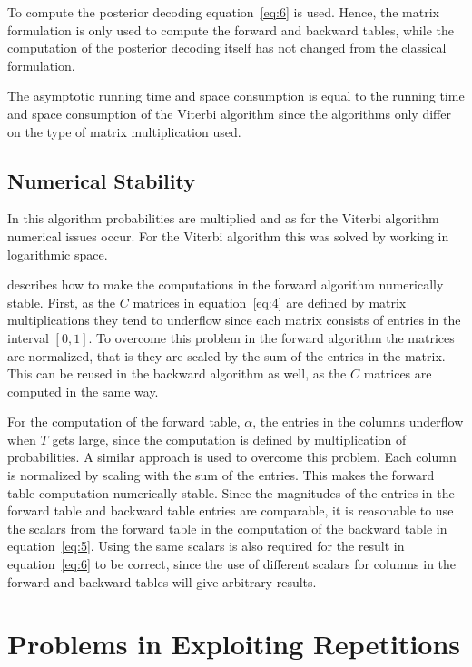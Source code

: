 To compute the posterior decoding equation~\eqref{eq:6} is used. Hence, the
matrix formulation is only used to compute the forward and backward tables,
while the computation of the posterior decoding itself has not changed from the
classical formulation.

The asymptotic running time and space consumption is equal to the running time
and space consumption of the Viterbi algorithm since the algorithms only
differ on the type of matrix multiplication used.

\subsection{Numerical Stability}

In this algorithm probabilities are multiplied and as for the Viterbi algorithm
numerical issues occur. For the Viterbi algorithm this was solved by working in
logarithmic space.

\citet{sand2013ziphmmlib} describes how to make the computations in the forward
algorithm numerically stable. First, as the $C$ matrices in
equation~\eqref{eq:4} are defined by matrix multiplications they tend to
underflow since each matrix consists of entries in the interval $[0, 1]$. To
overcome this problem in the forward algorithm the matrices are normalized,
that is they are scaled by the sum of the entries in the matrix. This can be
reused in the backward algorithm as well, as the $C$ matrices are computed in
the same way.

For the computation of the forward table, $\alpha$, the entries in the columns underflow when
$T$ gets large, since the computation is defined by multiplication of
probabilities. A similar approach is used to overcome this problem. Each column
is normalized by scaling with the sum of the entries. This makes the forward
table computation numerically stable. Since the magnitudes of the entries in
the forward table and backward table entries are comparable, it is reasonable
to use the scalars from the forward table in the computation of the backward
table in equation~\eqref{eq:5}. Using the same scalars is also required for the
result in equation~\eqref{eq:6} to be correct, since the use of different
scalars for columns in the forward and backward tables will give arbitrary
results.



\section{Problems in Exploiting Repetitions}
\label{sec:probl-expl-repet}

